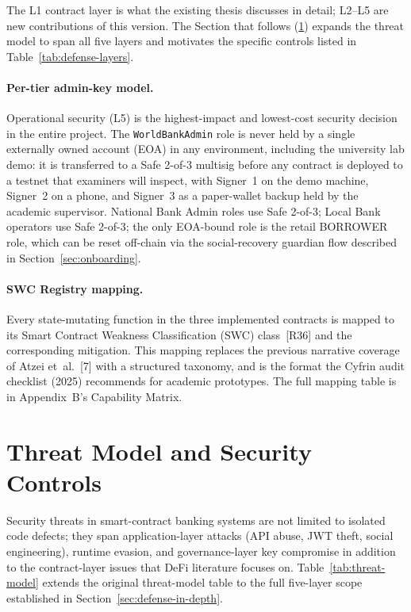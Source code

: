\documentclass[12pt,a4paper]{report}
\begin{document}
The L1 contract layer is what the existing thesis discusses in detail; L2--L5 are new contributions of this version. The Section that follows (\ref{sec:threat-model}) expands the threat model to span all five layers and motivates the specific controls listed in Table~\ref{tab:defense-layers}.

\paragraph{Per-tier admin-key model.}
Operational security (L5) is the highest-impact and lowest-cost security decision in the entire project. The \texttt{WorldBankAdmin} role is never held by a single externally owned account (EOA) in any environment, including the university lab demo: it is transferred to a Safe 2-of-3 multisig before any contract is deployed to a testnet that examiners will inspect, with Signer~1 on the demo machine, Signer~2 on a phone, and Signer~3 as a paper-wallet backup held by the academic supervisor. National Bank Admin roles use Safe 2-of-3; Local Bank operators use Safe 2-of-3; the only EOA-bound role is the retail BORROWER role, which can be reset off-chain via the social-recovery guardian flow described in Section~\ref{sec:onboarding}.

\paragraph{SWC Registry mapping.}
Every state-mutating function in the three implemented contracts is mapped to its Smart Contract Weakness Classification (SWC) class~[R36] and the corresponding mitigation. This mapping replaces the previous narrative coverage of Atzei et~al.~[7] with a structured taxonomy, and is the format the Cyfrin audit checklist (2025) recommends for academic prototypes. The full mapping table is in Appendix~B's Capability Matrix.

\section{Threat Model and Security Controls}
\label{sec:threat-model}

Security threats in smart-contract banking systems are not limited to isolated code defects; they span application-layer attacks (API abuse, JWT theft, social engineering), runtime evasion, and governance-layer key compromise in addition to the contract-layer issues that DeFi literature focuses on. Table~\ref{tab:threat-model} extends the original threat-model table to the full five-layer scope established in Section~\ref{sec:defense-in-depth}.
\end{document}

